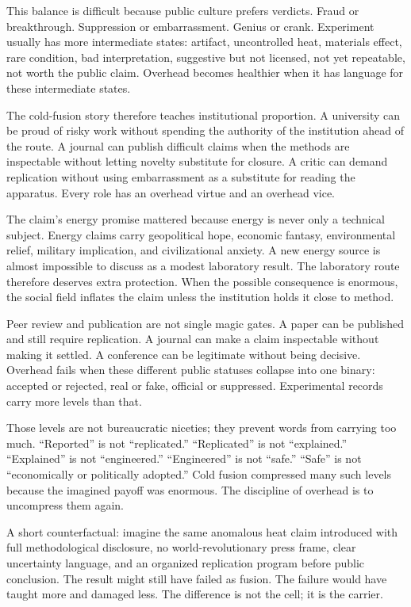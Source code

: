 This balance is difficult because public culture prefers verdicts. Fraud
or breakthrough. Suppression or embarrassment. Genius or crank. Experiment
usually has more intermediate states: artifact, uncontrolled heat,
materials effect, rare condition, bad interpretation, suggestive but not
licensed, not yet repeatable, not worth the public claim. Overhead becomes
healthier when it has language for these intermediate states.

The cold-fusion story therefore teaches institutional proportion. A
university can be proud of risky work without spending the authority of
the institution ahead of the route. A journal can publish difficult claims
when the methods are inspectable without letting novelty substitute for
closure. A critic can demand replication without using embarrassment as a
substitute for reading the apparatus. Every role has an overhead virtue
and an overhead vice.

The claim's energy promise mattered because energy is never only a
technical subject. Energy claims carry geopolitical hope, economic
fantasy, environmental relief, military implication, and civilizational
anxiety. A new energy source is almost impossible to discuss as a modest
laboratory result. The laboratory route therefore deserves extra
protection. When the possible consequence is enormous, the social field
inflates the claim unless the institution holds it close to method.

Peer review and publication are not single magic gates. A paper can be
published and still require replication. A journal can make a claim
inspectable without making it settled. A conference can be legitimate
without being decisive. Overhead fails when these different public
statuses collapse into one binary: accepted or rejected, real or fake,
official or suppressed. Experimental records carry more levels than that.

Those levels are not bureaucratic niceties; they prevent words from
carrying too much. ``Reported'' is not ``replicated.'' ``Replicated'' is
not ``explained.'' ``Explained'' is not ``engineered.'' ``Engineered''
is not ``safe.'' ``Safe'' is not ``economically or politically adopted.''
Cold fusion compressed many such levels because the imagined payoff was
enormous. The discipline of overhead is to uncompress them again.

A short counterfactual: imagine the same anomalous heat claim introduced
with full methodological disclosure, no world-revolutionary press frame,
clear uncertainty language, and an organized replication program before
public conclusion. The result might still have failed as
fusion. The failure would have taught more and damaged less. The
difference is not the cell; it is the carrier.

